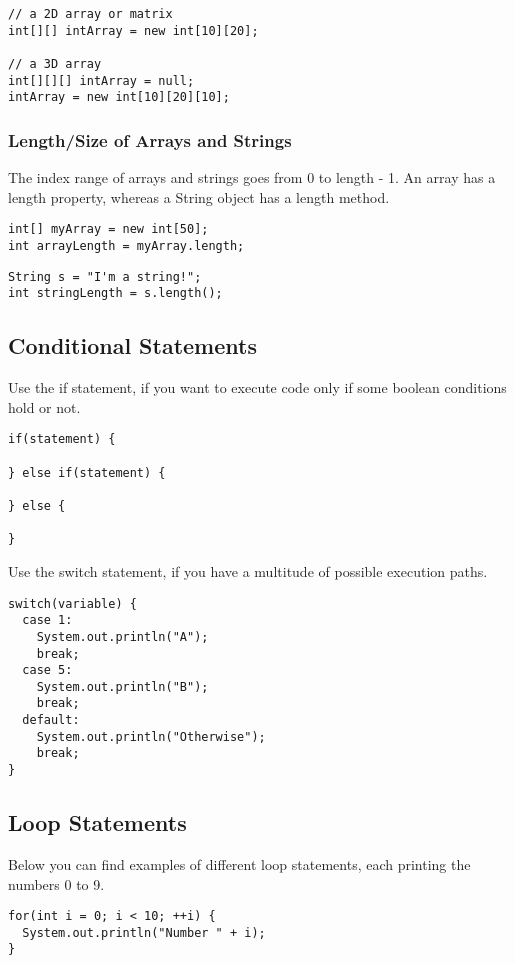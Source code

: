 \documentclass[papersize=a4,paper=landscape,11pt]{scrartcl}
\begin{document}
\begin{multicols*}{3}
\begin{lstlisting}
// a 2D array or matrix
int[][] intArray = new int[10][20];

// a 3D array
int[][][] intArray = null;
intArray = new int[10][20][10];
\end{lstlisting}

\subsubsection*{Length/Size of Arrays and Strings}
The index range of arrays and strings goes from 0 to length - 1.
An array has a length property, whereas a String object has a length method.

\begin{lstlisting}
int[] myArray = new int[50];
int arrayLength = myArray.length;
\end{lstlisting}

\begin{lstlisting}
String s = "I'm a string!";
int stringLength = s.length();
\end{lstlisting}

\subsection*{Conditional Statements}
Use the if statement, if you want to execute code only if some boolean conditions hold or not.
\begin{lstlisting}
if(statement) {

} else if(statement) {

} else {

}
\end{lstlisting}
Use the switch statement, if you have a multitude of possible execution paths.
\begin{lstlisting}
switch(variable) {
  case 1:
    System.out.println("A");
    break;
  case 5:
    System.out.println("B");
    break;
  default:
    System.out.println("Otherwise");
    break;
}
\end{lstlisting}

\subsection*{Loop Statements}
Below you can find examples of different loop statements, each printing the numbers 0 to 9.
\begin{lstlisting}
for(int i = 0; i < 10; ++i) {
  System.out.println("Number " + i);
}
\end{lstlisting}


\end{multicols*}
\end{document}
